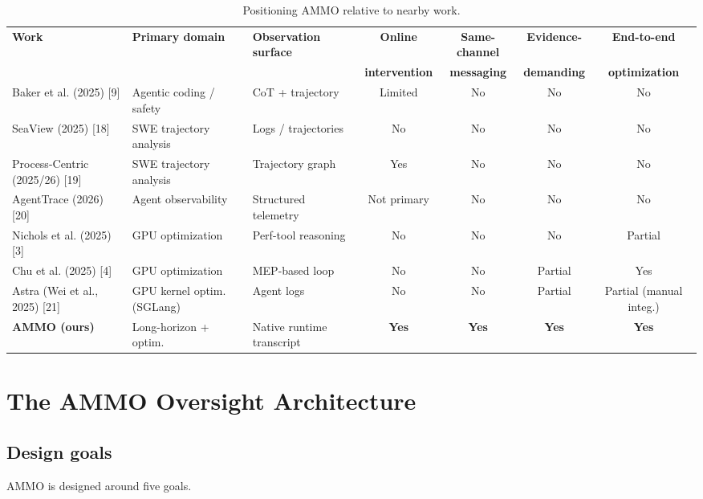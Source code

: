 \documentclass[11pt]{article}
\begin{document}
\begin{table}[h]
\centering
\caption{Positioning AMMO relative to nearby work.}
\label{tab:positioning}
\begin{adjustbox}{max width=\textwidth}
\small
\begin{tabular}{@{}lllcccc@{}}
\toprule
\textbf{Work} & \textbf{Primary domain} & \textbf{Observation surface} & \textbf{Online} & \textbf{Same-channel} & \textbf{Evidence-} & \textbf{End-to-end} \\
 & & & \textbf{intervention} & \textbf{messaging} & \textbf{demanding} & \textbf{optimization} \\
\midrule
Baker et al. (2025) [9] & Agentic coding / safety & CoT + trajectory & Limited & No & No & No \\
SeaView (2025) [18] & SWE trajectory analysis & Logs / trajectories & No & No & No & No \\
Process-Centric (2025/26) [19] & SWE trajectory analysis & Trajectory graph & Yes & No & No & No \\
AgentTrace (2026) [20] & Agent observability & Structured telemetry & Not primary & No & No & No \\
Nichols et al. (2025) [3] & GPU optimization & Perf-tool reasoning & No & No & No & Partial \\
Chu et al. (2025) [4] & GPU optimization & MEP-based loop & No & No & Partial & Yes \\
Astra (Wei et al., 2025) [21] & GPU kernel optim. (SGLang) & Agent logs & No & No & Partial & Partial (manual integ.) \\
\textbf{AMMO (ours)} & Long-horizon + optim. & Native runtime transcript & \textbf{Yes} & \textbf{Yes} & \textbf{Yes} & \textbf{Yes} \\
\bottomrule
\end{tabular}
\end{adjustbox}
\end{table}

\section{The AMMO Oversight Architecture}

\subsection{Design goals}

AMMO is designed around five goals.
\end{document}
